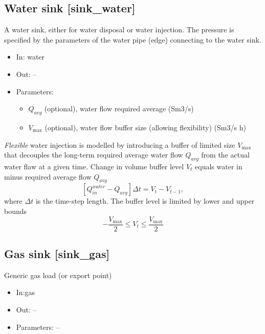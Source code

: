 \documentclass[12pt]{article}
\begin{document}
\subsection{Water sink [sink\_water]}

A  water sink, either for water disposal or water injection. The pressure is specified by the parameters of the water pipe (edge) connecting to the water sink.

\begin{itemize}
\item In: water
\item Out: --
\item Parameters:
\begin{itemize}[noitemsep,topsep=0pt]
	\item $Q_{avg}$  (optional), water flow required average (Sm3/s)
	\item $V_{\max }$ (optional),  water flow buffer size (allowing flexibility) (Sm3/s h) 
\end{itemize}
\end{itemize}

\medskip\noindent
\textit{Flexible} water injection is modelled by introducing a buffer of limited size $V_{\max }$ that decouples the long-term required average water flow  $Q_{avg}$ from the actual water flaw at a given time.
%
Change in volume buffer level  $V_{t}$  equals water in minus required average flow  \( Q_{avg} \) 
 \begin{equation}
 	\left[ Q_{in}^{water}-Q_{avg} \right]  \Delta t=V_{t}-V_{t-1}, 
 \end{equation}
where  $\Delta t$ is the time-step length.
%
The buffer level is limited by lower and upper bounds
 \begin{equation}
	 -\frac{V_{\max }}{2} \leq V_{t} \leq \frac{V_{\max }}{2} 
 \end{equation}





\subsection{Gas sink [sink\_gas]}
Generic gas load (or export point)

\begin{itemize}
\item In:gas
\item Out: --
\item Parameters: --
\end{itemize}
\end{document}
